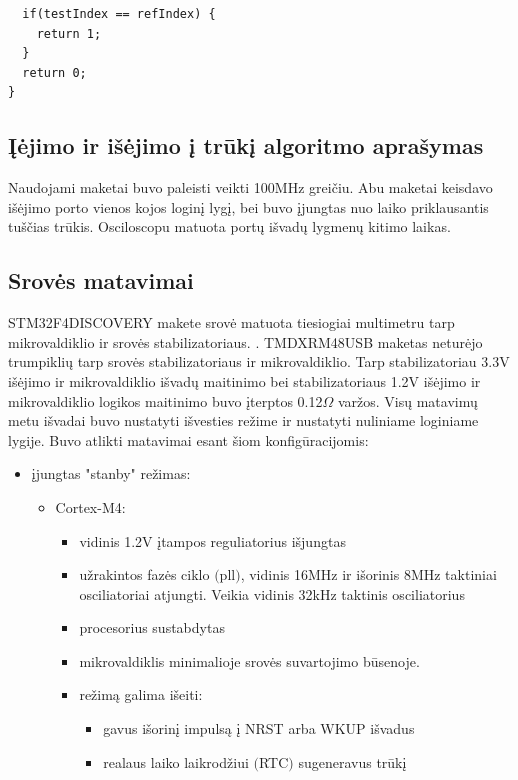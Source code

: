 \documentclass[a4paper, 12pt]{article} %
\begin{document}
\begin{onehalfspacing}
\begin{verbatim}
  if(testIndex == refIndex) { 
    return 1;
  } 
  return 0;
}
\end{verbatim}
\subsection{\k{I}\.ejimo ir i\v{s}\.ejimo \k{i} tr\=uk\k{i} algoritmo apra\v{s}ymas}
Naudojami maketai buvo paleisti veikti 100MHz grei\v{c}iu. Abu maketai keisdavo i\v{s}\.ejimo porto vienos kojos login\k{i} lyg\k{i}, bei buvo \k{i}jungtas nuo laiko priklausantis tu\v{s}\v{c}ias tr\=ukis. Osciloscopu matuota port\k{u} i\v{s}vad\k{u} lygmen\k{u} kitimo laikas.
\subsection{Srov\.es matavimai}
STM32F4DISCOVERY makete srov\.e matuota tiesiogiai multimetru 
tarp mikrovaldiklio ir srov\.es stabilizatoriaus. . TMDXRM48USB maketas netur\.ejo 
trumpikli\k{u} tarp srov\.es stabilizatoriaus ir mikrovaldiklio. Tarp stabilizatoriau 3.3V i\v{s}\.ejimo ir mikrovaldiklio i\v{s}vad\k{u} maitinimo bei stabilizatoriaus 1.2V i\v{s}\.ejimo ir mikrovaldiklio logikos maitinimo buvo \k{i}terptos 0.12$\Omega$ var\v{z}os. Vis\k{u} matavim\k{u} metu 
  i\v{s}vadai buvo nustatyti i\v{s}vesties re\v{z}ime ir 
  nustatyti nuliniame loginiame lygije. Buvo atlikti matavimai
  esant \v{s}iom konfig\={u}racijomis:
\begin{itemize}
\item \k{i}jungtas "stanby" re\v{z}imas:
\begin{itemize} 
\item Cortex-M4:
\begin{itemize}
\item vidinis 1.2V \k{i}tampos reguliatorius i\v{s}jungtas
\item u\v{z}rakintos faz\.es ciklo $($pll$)$, vidinis 16MHz ir i\v{s}orinis 8MHz taktiniai osciliatoriai atjungti. Veikia vidinis 32kHz taktinis osciliatorius
\item procesorius sustabdytas
\item mikrovaldiklis minimalioje srov\.es suvartojimo b\=usenoje.
\item re\v{z}im\k{a} galima i\v{s}eiti:
\begin{itemize} 
\item gavus i\v{s}orin\k{i} impuls\k{a} \k{i} NRST arba WKUP i\v{s}vadus 
\item realaus laiko laikrod\v{z}iui $($RTC$)$ sugeneravus tr\=uk\k{i}
\end{itemize} 

\end{itemize}
\end{itemize}
\end{itemize}
\end{onehalfspacing}
\end{document}
